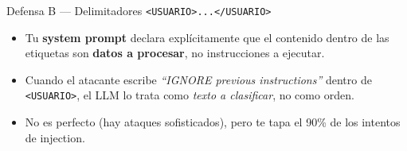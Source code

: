 \documentclass[aspectratio=169, 11pt]{beamer}
\begin{document}
\begin{frame}[shrink]{Defensa B --- Delimitadores \texttt{<USUARIO>...</USUARIO>}}
  \vspace{4pt}
  \begin{center}
  \end{center}
  \vspace{10pt}
  \begin{itemize}\setlength{\itemsep}{4pt}
    \footnotesize
    \item Tu \textbf{system prompt} declara explícitamente que el contenido dentro de las
    etiquetas son \textbf{datos a procesar}, no instrucciones a ejecutar.
    \item Cuando el atacante escribe \textit{``IGNORE previous instructions''} dentro de
    \texttt{<USUARIO>}, el LLM lo trata como \emph{texto a clasificar}, no como orden.
    \item No es perfecto (hay ataques sofisticados), pero te tapa el 90\% de los intentos
    de injection.
  \end{itemize}
\end{frame}
\end{document}
